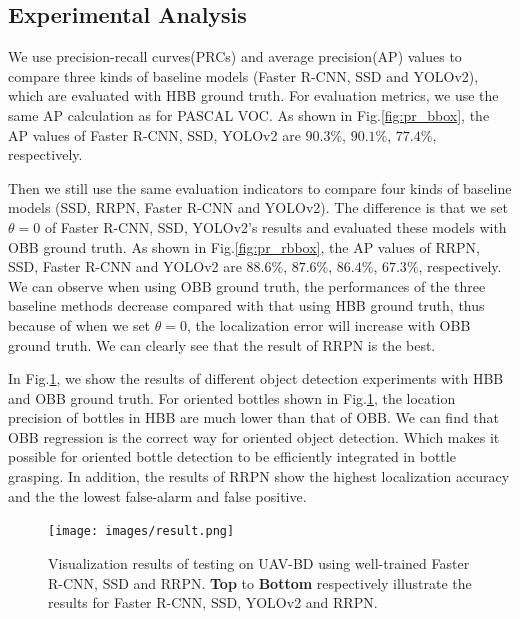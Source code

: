 

\subsection{Experimental Analysis}

We use precision-recall curves(PRCs) and average precision(AP) values to compare three kinds of baseline models (Faster R-CNN, SSD and YOLOv2), which are evaluated with HBB ground truth. For evaluation metrics, we use the same AP calculation as for PASCAL VOC. As shown in Fig.\ref{fig:pr_bbox}, the AP values of Faster R-CNN, SSD, YOLOv2 are $ 90.3\% $, $ 90.1\% $, $ 77.4\% $, respectively.

Then we still use the same evaluation indicators to compare four kinds of baseline models (SSD, RRPN, Faster R-CNN and YOLOv2). The difference is that we set $ \theta = 0 $ of Faster R-CNN, SSD, YOLOv2's results and evaluated these models with OBB ground truth. As shown in Fig.\ref{fig:pr_rbbox}, the AP values of RRPN, SSD, Faster R-CNN and YOLOv2 are $ 88.6\% $, $ 87.6\% $, $ 86.4\% $, $ 67.3\% $, respectively. We can observe when using OBB ground truth, the performances of the three baseline methods decrease compared with that using HBB ground truth, thus because of when we set $ \theta = 0 $, the localization error will increase with OBB ground truth. We can clearly see that the result of RRPN is the best.

In Fig.\ref{fig:result}, we show the results of different object detection experiments with HBB and OBB ground truth. For oriented bottles shown in Fig.\ref{fig:result}, the location precision of bottles in HBB are much lower than that of OBB. We can find that OBB regression is the correct way for oriented object detection. Which makes it possible for oriented bottle detection to be efficiently integrated in bottle grasping. In addition, the results of RRPN show the highest localization accuracy and the the lowest false-alarm and false positive.


\begin{figure}
	\texttt{[image: images/result.png]}
	\caption{Visualization results of testing on UAV-BD using well-trained Faster R-CNN, SSD and RRPN. \textbf{Top} to \textbf{Bottom} respectively illustrate the results for Faster R-CNN, SSD, YOLOv2 and RRPN.}
	\label{fig:result}
\end{figure}


